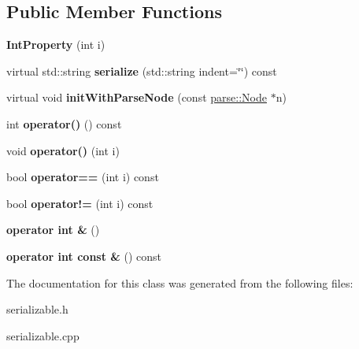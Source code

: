 \subsection*{Public Member Functions}
\begin{DoxyCompactItemize}
\item 
\hypertarget{classg2c_1_1_int_property_a3af2ffba10f6e60c56ef6c9080371d49}{
{\bfseries IntProperty} (int i)}
\label{classg2c_1_1_int_property_a3af2ffba10f6e60c56ef6c9080371d49}

\item 
\hypertarget{classg2c_1_1_int_property_a246f7e3710103a870e4682d1b204649d}{
virtual std::string {\bfseries serialize} (std::string indent=\char`\"{}\char`\"{}) const }
\label{classg2c_1_1_int_property_a246f7e3710103a870e4682d1b204649d}

\item 
\hypertarget{classg2c_1_1_int_property_a11251ab316b7b728322cf93ae204b960}{
virtual void {\bfseries initWithParseNode} (const \hyperlink{classparse_1_1_node}{parse::Node} $\ast$n)}
\label{classg2c_1_1_int_property_a11251ab316b7b728322cf93ae204b960}

\item 
\hypertarget{classg2c_1_1_int_property_a3eb13d808fee08e98430f18d228f92eb}{
int {\bfseries operator()} () const }
\label{classg2c_1_1_int_property_a3eb13d808fee08e98430f18d228f92eb}

\item 
\hypertarget{classg2c_1_1_int_property_aca77be22b4401b08948dee118ed8985c}{
void {\bfseries operator()} (int i)}
\label{classg2c_1_1_int_property_aca77be22b4401b08948dee118ed8985c}

\item 
\hypertarget{classg2c_1_1_int_property_a1883076bdb55aec9f689a5561cd3ce05}{
bool {\bfseries operator==} (int i) const }
\label{classg2c_1_1_int_property_a1883076bdb55aec9f689a5561cd3ce05}

\item 
\hypertarget{classg2c_1_1_int_property_a1aaa92744d9a4d5ce87395b2cc300c33}{
bool {\bfseries operator!=} (int i) const }
\label{classg2c_1_1_int_property_a1aaa92744d9a4d5ce87395b2cc300c33}

\item 
\hypertarget{classg2c_1_1_int_property_a7cfeacf843766de414635db88bffe771}{
{\bfseries operator int \&} ()}
\label{classg2c_1_1_int_property_a7cfeacf843766de414635db88bffe771}

\item 
\hypertarget{classg2c_1_1_int_property_a15ab7e9edfe7541734e4cdfb2403f0c7}{
{\bfseries operator int const \&} () const }
\label{classg2c_1_1_int_property_a15ab7e9edfe7541734e4cdfb2403f0c7}

\end{DoxyCompactItemize}


The documentation for this class was generated from the following files:\begin{DoxyCompactItemize}
\item 
serializable.h\item 
serializable.cpp\end{DoxyCompactItemize}
